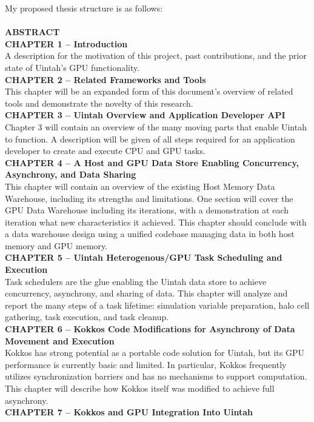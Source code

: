 \documentclass[12pt]{article}
\begin{document}
My proposed thesis structure is as follows:\\
\\
\textbf{ABSTRACT}\\
\textbf{CHAPTER 1 – Introduction}\\
A description for the motivation of this project, past contributions, and the prior state of Uintah's GPU functionality.\\  
\textbf{CHAPTER 2 – Related Frameworks and Tools}\\
This chapter will be an expanded form of this document's overview of related tools and demonstrate the novelty of this research.\\  
\textbf{CHAPTER 3 – Uintah Overview and Application Developer API}\\
Chapter 3 will contain an overview of the many moving parts that enable Uintah to function.  A description will be given of all steps required for an application developer to create and execute CPU and GPU tasks.\\  
\textbf{CHAPTER 4 -- A Host and GPU Data Store Enabling Concurrency, Asynchrony, and Data Sharing}\\ 
This chapter will contain an overview of the existing Host Memory Data Warehouse, including its strengths and limitations.  One section will cover the GPU Data Warehouse including its iterations, with a demonstration at each iteration what new characteristics it achieved.  This chapter should conclude with a data warehouse design using a unified codebase managing data in both host memory and GPU memory.\\  
\textbf{CHAPTER 5 – Uintah Heterogenous/GPU Task Scheduling and Execution}\\
Task schedulers are the glue enabling the Uintah data store to achieve concurrency, asynchrony, and sharing of data.  This chapter will analyze and report the many steps of a task lifetime: simulation variable preparation, halo cell gathering, task execution, and task cleanup.\\ 
\textbf{CHAPTER 6 – Kokkos Code Modifications for Asynchrony of Data Movement and Execution}\\
Kokkos has strong potential as a portable code solution for Uintah, but its GPU performance is currently basic and limited.  In particular, Kokkos frequently utilizes synchronization barriers and has no mechanisms to support computation. This chapter will describe how Kokkos itself was modified to achieve full asynchrony.\\
\textbf{CHAPTER 7 – Kokkos and GPU Integration Into Uintah}\\
\end{document}
